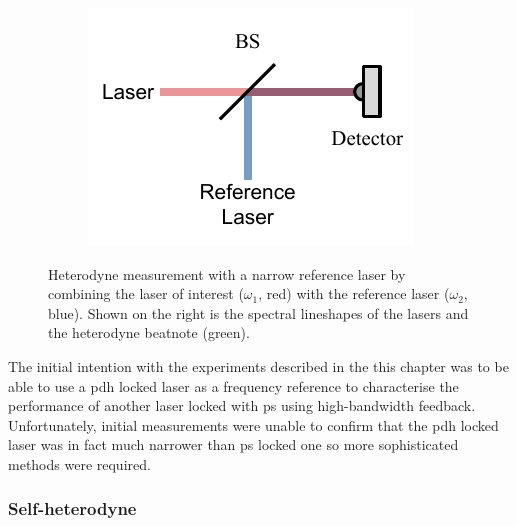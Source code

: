 \begin{figure}
    \begin{subfigure}{0.49\linewidth}
    \includegraphics{part1/Figs/HeterodyneReferenceLaser.pdf}
    \end{subfigure}
    \begin{subfigure}{0.49\linewidth}
    
    \end{subfigure}
    \caption{Heterodyne measurement with a narrow reference laser by combining the laser of interest ($\omega_1$, red) with the reference laser ($\omega_2$, blue). Shown on the right is the spectral lineshapes of the lasers and the heterodyne beatnote (green).}
    \label{figure:heterodyne_reference}
\end{figure}

The initial intention with the experiments described in the this chapter was to be able to use a \gls{pdh} locked laser as a frequency reference to characterise the performance of another laser locked with \gls{ps} using high-bandwidth feedback.
Unfortunately, initial measurements were unable to confirm that the \gls{pdh} locked laser was in fact much narrower than \gls{ps} locked one so more sophisticated methods were required.

\subsubsection{Self-heterodyne}


